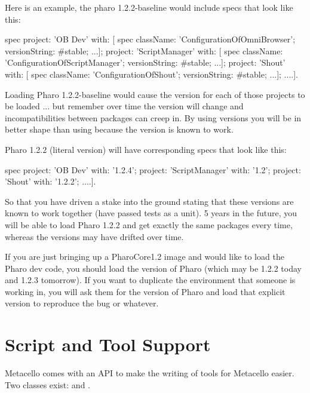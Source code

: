 \documentclass[a4paper,10pt,twoside]{book}
\begin{document}
Here is an example, the pharo 1.2.2-baseline would include specs that look like this:

\begin{code}{}
 spec
    project: 'OB Dev' with: [
      spec
         className: 'ConfigurationOfOmniBrowser';
         versionString: #stable;
         ...];
    project: 'ScriptManager' with: [
      spec
         className: 'ConfigurationOfScriptManager';
         versionString: #stable;
         ...];
    project: 'Shout' with: [
      spec
         className: 'ConfigurationOfShout';
         versionString: #stable;
         ...];
    ....].
    
 \end{code}

Loading Pharo 1.2.2-baseline would cause the  version for each of those projects to be loaded ... 
but remember over time the  version will change and incompatibilities between packages can creep in. 
By using  versions you will be in better shape than using  because the  version is known to work.

Pharo 1.2.2 (literal version) will have corresponding specs that look like this:

\begin{code}{}
 spec
    project: 'OB Dev' with: '1.2.4';
    project: 'ScriptManager' with: '1.2';
    project: 'Shout' with: '1.2.2';
    ....].
\end{code}

So that you have driven a stake into the ground stating that these versions are known to work together (have passed tests as a unit). 5 years in the future, you will be able to load Pharo 1.2.2 and get exactly the same packages every time, whereas the  versions may have drifted over time.

If you are just bringing up a PharoCore1.2 image and would like to load the Pharo dev code, you should load the  version of Pharo (which may be 1.2.2 today and 1.2.3 tomorrow).
If you want to duplicate the environment that someone is working in, you will ask them for the version of Pharo and load that explicit version to reproduce the bug or whatever. 


\section{Script and Tool Support}
Metacello comes with an API to make the writing of tools for Metacello easier. Two classes exist:  and . 
\end{document}

